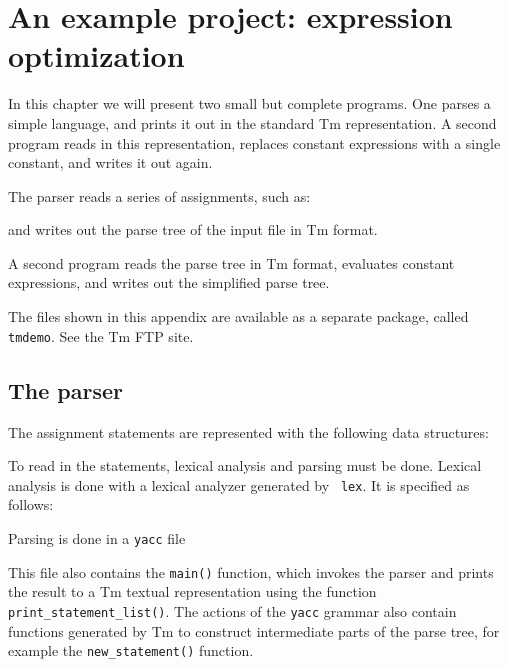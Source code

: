 \chapter{An example project: expression optimization}
\label{s.calc}
In this chapter we will present two small but complete programs.
One parses a simple language, and prints it out in the standard Tm
representation.  A second program reads in this representation, replaces
constant expressions with a single constant, and writes it out again.

The parser reads a series of assignments, such as:
\begin{showfile}
\end{showfile}
and writes out the parse tree of the input file in Tm format.

A second program reads the parse tree in Tm format, evaluates constant
expressions, and writes out the simplified parse tree.

The files shown in this appendix are available as a separate package,
called \verb'tmdemo'. See the Tm FTP site.

\section{The parser}
\label{s.calcparser}
The assignment statements are represented with the following data structures:
\begin{showfile}
\end{showfile}

To read in the statements, lexical analysis and parsing must be done.
Lexical analysis is done with a lexical analyzer generated by {\tt
lex}. It is specified as follows:
\begin{showfile}
\end{showfile}

Parsing is done in a {\tt yacc} file
\begin{showfile}
\end{showfile}

This file also contains the \verb'main()' function, which invokes the
parser and prints the result to a Tm textual representation using the
function \verb'print_statement_list()'. The actions of the {\tt yacc}
grammar also contain functions generated by Tm to construct intermediate 
parts of the parse tree, for example the \verb'new_statement()' function.

